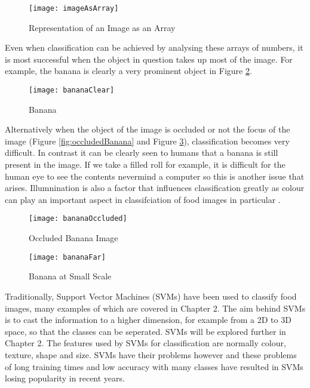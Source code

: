 \begin{figure}[h]
	\centering
	\texttt{[image: imageAsArray]}
	\caption{Representation of an Image as an Array}
	\label{fig:imageArray}
\end{figure}

Even when classification can be achieved by analysing these arrays of numbers, it is most successful when the object in question takes up most of the image.
For example, the banana is clearly a very prominent object in Figure \ref{fig:bananaClear}.

\begin{figure}[h]
	\texttt{[image: bananaClear]}
	\caption{Banana}
	\label{fig:bananaClear}
\end{figure}

Alternatively when the object of the image is occluded or not the focus of the image (Figure \ref{fig:occludedBanana} and Figure \ref{fig:farBanana}), classification becomes very difficult.
In contrast it can be clearly seen to humans that a banana is still present in the image.
If we take a filled roll for example, it is difficult for the human eye to see the contents nevermind a computer so this is another issue that arises.
Illumnination is also a factor that influences classification greatly as colour can play an important aspect in classifciation of food images in particular \textcite{novelSVM}.

\begin{figure}[h] 
  \label{ fig7} 
  \begin{minipage}[h]{0.5\linewidth}
    \centering
    \texttt{[image: bananaOccluded]} 
    \caption{Occluded Banana Image} 
  \label{fig:occludedBanana}
    \vspace{4ex}
  \end{minipage}%
  \begin{minipage}[h]{0.5\linewidth}
    \centering
    \texttt{[image: bananaFar]} 
    \caption{Banana at Small Scale} 
  \label{fig:farBanana}
    \vspace{4ex}
  \end{minipage} 
\end{figure}

Traditionally, Support Vector Machines (SVMs) have been used to classify food images, many examples of which are covered in Chapter 2.
The aim behind SVMs is to cast the information to a higher dimension, for example from a 2D to 3D space, so that the classes can be seperated. SVMs will be explored further in Chapter 2.
The features used by SVMs for classification are normally colour, texture, shape and size.
SVMs have their problems however and these problems of long training times and low accuracy with many classes have resulted in SVMs losing popularity in recent years.

